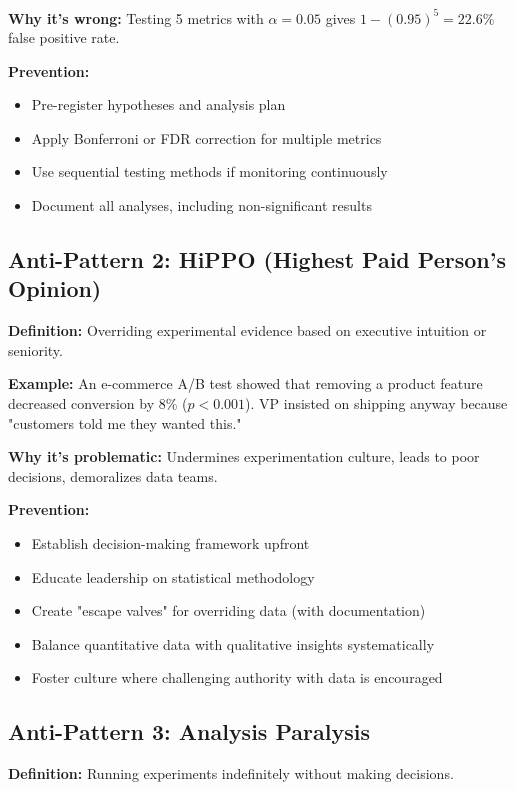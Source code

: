 \textbf{Why it's wrong:} Testing 5 metrics with $\alpha=0.05$ gives $1-(0.95)^5 = 22.6\%$ false positive rate.

\textbf{Prevention:}
\begin{itemize}
    \item Pre-register hypotheses and analysis plan
    \item Apply Bonferroni or FDR correction for multiple metrics
    \item Use sequential testing methods if monitoring continuously
    \item Document all analyses, including non-significant results
\end{itemize}

\subsection{Anti-Pattern 2: HiPPO (Highest Paid Person's Opinion)}

\textbf{Definition:} Overriding experimental evidence based on executive intuition or seniority.

\textbf{Example:} An e-commerce A/B test showed that removing a product feature decreased conversion by 8\% ($p<0.001$). VP insisted on shipping anyway because "customers told me they wanted this."

\textbf{Why it's problematic:} Undermines experimentation culture, leads to poor decisions, demoralizes data teams.

\textbf{Prevention:}
\begin{itemize}
    \item Establish decision-making framework upfront
    \item Educate leadership on statistical methodology
    \item Create "escape valves" for overriding data (with documentation)
    \item Balance quantitative data with qualitative insights systematically
    \item Foster culture where challenging authority with data is encouraged
\end{itemize}

\subsection{Anti-Pattern 3: Analysis Paralysis}

\textbf{Definition:} Running experiments indefinitely without making decisions.

